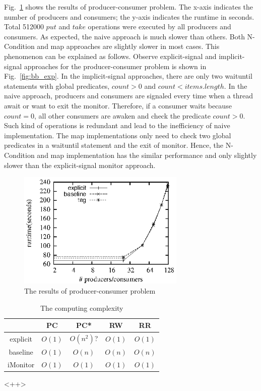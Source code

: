 \documentclass[preprint]{sigplanconf}
\begin{document}
Fig.~\ref{fig:pc_eval} shows the results of producer-consumer problem. The
x-axis indicates the number of producers and consumers; the y-axis indicates the
runtime in seconds. Total 512000 $put$ and $take$ operations were executed by
all producers and consumers. As expected, the naive approach is much slower than
others. Both N-Condition and map approaches are slightly slower in most cases.
This phenomenon can be explained as follows. Observe explicit-signal and 
implicit-signal approaches for the producer-consumer problem is shown in 
Fig.~\ref{fig:bb_exp}. In the implicit-signal approaches, there are only two 
waituntil statements with global predicates, $count > 0$ and 
$count < items.length$. In the naive approach, producers and consumers are
signaled every time when a thread await or want to exit the monitor. Therefore,
if a consumer waits because $count = 0$, all other consumers are awaken and
check the predicate $count > 0$. Such kind of operations is redundant and lead
to the inefficiency of naive implementation. The map
implementations only need to check two global predicates in a waituntil
statement and the exit of monitor. Hence, the N-Condition and map implementation 
has the similar performance and only slightly slower than the explicit-signal
monitor approach. 
\begin{figure}[ht!]
  \centering
  \includegraphics[width=80mm]{fig/pc.eps}
  \caption{The results of producer-consumer problem}
  \label{fig:pc_eval}
\end{figure}

\begin{table}
   \centering
   \begin{tabular}{|c||c|c|c|c|}
      \hline 
         & PC & PC* & RW & RR \\
      \hline 
      explicit & $O(1)$ & $O(n^2)$? & $O(1)$ & $O(1)$ \\
      \hline 
      baseline & $O(1)$ & $O(n)$ & $O(n)$ & $O(n)$ \\
      \hline 
      iMonitor & $O(1)$ & $O(1)$ & $O(1)$ & $O(1)$ \\
      \hline 
   \end{tabular}
   \caption{The computing complexity}
   \label{tab:<+label+>}
\end{table}<++>
\end{document}
